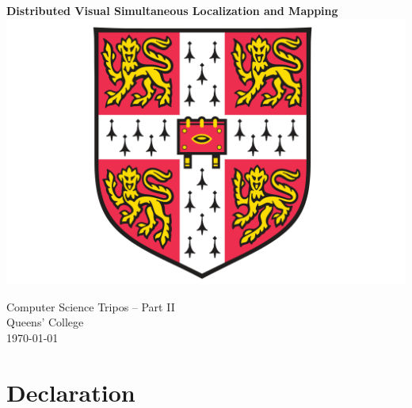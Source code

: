\documentclass[12pt,a4paper,twoside,openright]{report}
\begin{document}



\pagestyle{empty}


\vspace*{30mm}
\begin{center}
	\Huge
	\textbf{Distributed Visual Simultaneous Localization and Mapping} \\[20mm]

	\vspace{-2mm}
	\includegraphics[scale=0.5]{./figures/crest.png}
	\hspace{0mm}\\[20mm]
	\vspace{2mm}


	\LARGE
	Computer Science Tripos -- Part II \\[1mm]
	Queens' College \\[20mm]

	\Large
	\today
\end{center}

\newpage
\thispagestyle{empty}


\pagestyle{plain}


\section*{Declaration}
\end{document}
